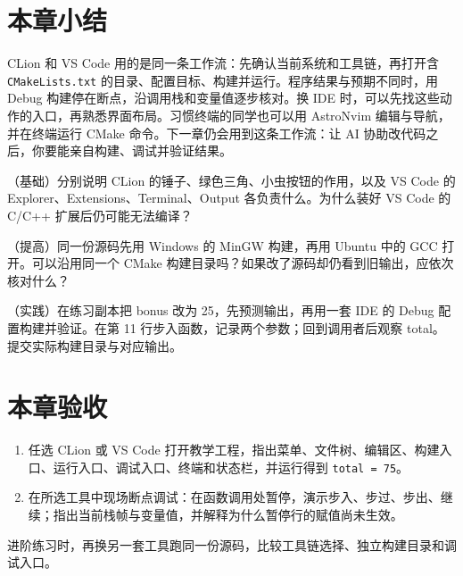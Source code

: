 \section{本章小结}
CLion 和 VS Code 用的是同一条工作流：先确认当前系统和工具链，再打开含 \texttt{CMakeLists.txt} 的目录、配置目标、构建并运行。程序结果与预期不同时，用 Debug 构建停在断点，沿调用栈和变量值逐步核对。换 IDE 时，可以先找这些动作的入口，再熟悉界面布局。习惯终端的同学也可以用 AstroNvim 编辑与导航，并在终端运行 CMake 命令。下一章仍会用到这条工作流：让 AI 协助改代码之后，你要能亲自构建、调试并验证结果。

\begin{problemset}
\item \label{prob:v0-ide-1} （基础）分别说明 CLion 的锤子、绿色三角、小虫按钮的作用，以及 VS Code 的 Explorer、Extensions、Terminal、Output 各负责什么。为什么装好 VS Code 的 C/C++ 扩展后仍可能无法编译？
\item \label{prob:v0-ide-2} （提高）同一份源码先用 Windows 的 MinGW 构建，再用 Ubuntu 中的 GCC 打开。可以沿用同一个 CMake 构建目录吗？如果改了源码却仍看到旧输出，应依次核对什么？
\item \label{prob:v0-ide-3} （实践）在练习副本把 bonus 改为 25，先预测输出，再用一套 IDE 的 Debug 配置构建并验证。在第 11 行步入函数，记录两个参数；回到调用者后观察 total。提交实际构建目录与对应输出。
\end{problemset}

\section{本章验收}
\begin{enumerate}
\item 任选 CLion 或 VS Code 打开教学工程，指出菜单、文件树、编辑区、构建入口、运行入口、调试入口、终端和状态栏，并运行得到 \texttt{total = 75}。
\item 在所选工具中现场断点调试：在函数调用处暂停，演示步入、步过、步出、继续；指出当前栈帧与变量值，并解释为什么暂停行的赋值尚未生效。
\end{enumerate}

进阶练习时，再换另一套工具跑同一份源码，比较工具链选择、独立构建目录和调试入口。
